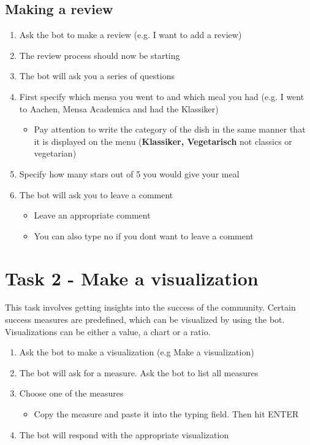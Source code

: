 \subsection*{Making a review}
\begin{enumerate}
    \item Ask the bot to make a review (e.g. I want to add a review)
    \item The review process should now be starting 
    \item The bot will ask you a series of questions
    \item First specify which mensa you went to and which meal you had (e.g. I went to Aachen, Mensa Academica and had the Klassiker) 
    \begin{itemize}
      \item Pay attention to write the category of the dish in the same manner that it is displayed on the menu (\textbf{Klassiker, Vegetarisch} not classics or vegetarian)
    \end{itemize}
    \item Specify how many stars out of 5 you would give your meal
    \item The bot will ask you to leave a comment
    \begin{itemize}
        \item Leave an appropriate comment
        \item You can also type no if you dont want to leave a comment
      \end{itemize}
\end{enumerate}

\section*{Task 2 - Make a visualization}
This task involves getting insights into the success of the community. Certain success measures are predefined, which can be visualized by using the bot. Visualizations can be either a value, a chart or a ratio.
\begin{enumerate}
    \item Ask the bot to make a visualization (e.g Make a visualization)
    \item The bot will ask for a measure. Ask the bot to list all measures
    \item Choose one of the measures 
    \begin{itemize}
        \item Copy the measure and paste it into the typing field. Then hit ENTER
    \end{itemize}
    \item The bot will respond with the appropriate visualization
    
\end{enumerate}


